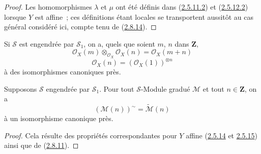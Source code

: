 \begin{proof}
Les homomorphismes $\lambda$ et $\mu$ ont été définis dans
(\hyperref[II.2.5.11.2-fr]{2.5.11.2}) et
(\hyperref[II.2.5.12.2-fr]{2.5.12.2}) lorsque $Y$ est affine~; ces définitions
étant locales se transportent aussitôt au cas général considéré ici, compte
tenu de (\hyperref[II.2.8.14-fr]{2.8.14}).
\end{proof}

\begin{corollary}[3.2.7]
\label{II.3.2.7-fr}
Si $\mathcal{S}$ est engendrée par $\mathcal{S}_1$, on a, quels que soient
$m$, $n$ dans $\mathbf{Z}$,
\[
\label{II.3.2.7.1-fr}
  \mathcal{O}_X(m)\otimes_{\mathcal{O}_X}\mathcal{O}_X(n)
  =\mathcal{O}_X(m+n)
\tag{3.2.7.1}
\]
\[
\label{II.3.2.7.2-fr}
  \mathcal{O}_X(n)=(\mathcal{O}_X(1))^{\otimes n}
\tag{3.2.7.2}
\]
à des isomorphismes canoniques près.
\end{corollary}


\begin{corollary}[3.2.8]
\label{II.3.2.8-fr}
Supposons $\mathcal{S}$ engendrée par $\mathcal{S}_1$. Pour tout
$\mathcal{S}$-Module gradué $\mathcal{M}$ et tout $n\in\mathbf{Z}$, on a
\[
\label{II.3.2.8.1-fr}
  (\mathcal{M}(n))^{\sim}=\widetilde{\mathcal{M}}(n)
\tag{3.2.8.1}
\]
à un isomorphisme canonique près.
\end{corollary}

\begin{proof}
Cela résulte des propriétés correspondantes pour $Y$ affine
(\hyperref[II.2.5.14-fr]{2.5.14} et
\hyperref[II.2.5.15-fr]{2.5.15}) ainsi que de
(\hyperref[II.2.8.11-fr]{2.8.11}).
\end{proof}

